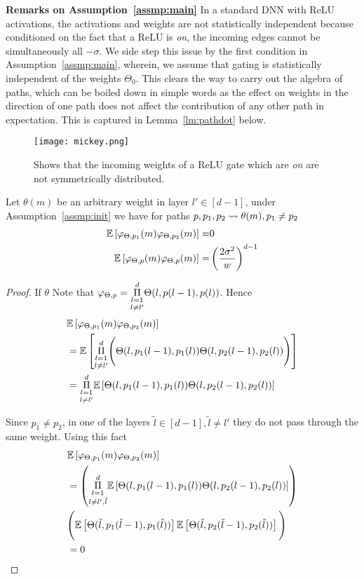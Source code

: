 {\textbf{Remarks on Assumption~\ref{assmp:main}}
In a standard DNN with ReLU activations, the activations and weights are not statistically independent because conditioned on the fact that a ReLU is \emph{on}, the incoming edges cannot be simultaneously all $-\sigma$. We side step this issue by the first condition in Assumption~\ref{assmp:main}, wherein, we assume that  gating is statistically independent of the weights $\Theta_0$. This clears the way to carry out the algebra of paths, which can be boiled down in simple words as the effect on weights in the direction of one path does not affect the contribution of any other path in expectation. This is captured in Lemma~\ref{lm:pathdot} below.
\begin{figure}
\centering
\texttt{[image: mickey.png]}
\caption{Shows that the incoming weights of a ReLU gate which are \emph{on} are not symmetrically distributed.}
\end{figure}

\begin{lemma}\label{lm:pathdot}
Let $\theta(m)$ be an arbitrary weight in layer $l'\in [d-1]$, under Assumption~\ref{assmp:init} we have for paths $p,p_1,p_2\rightsquigarrow\theta(m), p_1\neq p_2$
\begin{align*}
\mathbb{E}\left[\varphi_{{\Theta},p_1}(m)\varphi_{{\Theta},p_2}(m)\right]= &0\\
\mathbb{E}\left[\varphi_{{\Theta},p}(m)\varphi_{{\Theta},p}(m)\right]= &\left(\frac{2\sigma^2}{w}\right)^{d-1}
\end{align*}
\end{lemma}
\begin{proof}
If $\theta$
Note that $\varphi_{{\Theta},p}=\underset{l\neq l'}{\underset{l=1}{\overset{d}{\Pi}}} {\Theta}(l,p(l-1),p(l))$. Hence
\begin{align*}
&\mathbb{E}\left[\varphi_{{\Theta},p_1}(m)\varphi_{{\Theta},p_2}(m)\right]\\
&=\mathbb{E}\left[\underset{l\neq l'}{\underset{l=1}{\overset{d}{\Pi}}} \Bigg({\Theta}(l,p_1(l-1),p_1(l)){\Theta}(l,p_2(l-1),p_2(l)) \Bigg)\right]\\
&=\underset{l\neq l'}{\underset{l=1}{\overset{d}{\Pi}}}\mathbb{E}\left[{\Theta}(l,p_1(l-1),p_1(l)){\Theta}(l,p_2(l-1),p_2(l))\right]
\end{align*}

Since $p_1\neq p_2$, in one of the layers $\tilde{l}\in[d-1],\tilde{l}\neq l'$ they do not pass through the same weight. Using this fact
\begin{align*}
&\mathbb{E}\left[\varphi_{{\Theta},p_1}(m)\varphi_{{\Theta},p_2}(m)\right]\\
&=\left(\underset{l\neq l',\tilde{l}}{\underset{l=1}{\overset{d}{\Pi}}}\mathbb{E}\left[{\Theta}(l,p_1(l-1),p_1(l)){\Theta}(l,p_2(l-1),p_2(l))\right]\right)\\
&\Bigg(\mathbb{E}\left[{\Theta}(\tilde{l},p_1(\tilde{l}-1),p_1(\tilde{l}))\right]\mathbb{E}\left[{\Theta}(\tilde{l},p_2(\tilde{l}-1),p_2(\tilde{l}))\right]\Bigg)\\
&=0
\end{align*}
\end{proof}


}
